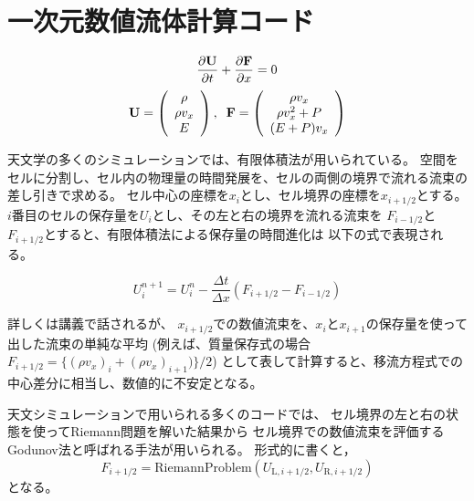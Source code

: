 \section{一次元数値流体計算コード}
\begin{equation}
    \frac{\partial {\bf U}}{\partial t} 
    + \frac{\partial {\bf F}}{\partial x}=0
\end{equation}
\begin{equation}
    {\bf U} = \left( 
        \begin{array}{c}
            \rho \\
            \rho v_x \\
            E
    \end{array}
\right),\;\;
    {\bf F} = \left( 
        \begin{array}{c}
            \rho v_x \\
            \rho v_x^2 + P \\
            (E + P)v_x
    \end{array}
\right)
\label{hydro1d_eq}
\end{equation}

天文学の多くのシミュレーションでは、有限体積法が用いられている。
空間をセルに分割し、セル内の物理量の時間発展を、セルの両側の境界で流れる流束の
差し引きで求める。
セル中心の座標を$x_{i}$とし、セル境界の座標を$x_{i+1/2}$とする。
$i$番目のセルの保存量を$U_i$とし、その左と右の境界を流れる流束を
$F_{i-1/2}$と$F_{i+1/2}$とすると、有限体積法による保存量の時間進化は
以下の式で表現される。

\begin{screen}
\begin{equation}
    U_i^{n+1} = U_i^n - \frac{\Delta t}{\Delta x} \left( F_{i+1/2} - F_{i-1/2} \right)
\end{equation}
\end{screen}

詳しくは講義で話されるが、
$x_{i+1/2}$での数値流束を、$x_i$と$x_{i+1}$の保存量を使って
出した流束の単純な平均
(例えば、質量保存式の場合$F_{i+1/2}=\{ (\rho v_x)_i + (\rho v_x)_{i+1})\}/2$)
として表して計算すると、移流方程式での中心差分に相当し、数値的に不安定となる。

天文シミュレーションで用いられる多くのコードでは、
セル境界の左と右の状態を使ってRiemann問題を解いた結果から
セル境界での数値流束を評価するGodunov法と呼ばれる手法が用いられる。
形式的に書くと，
\begin{equation}
    F_{i+1/2} = \mathrm{RiemannProblem}(U_{\mathrm{L},i+1/2},U_{\mathrm{R},i+1/2})
\end{equation}
となる。

